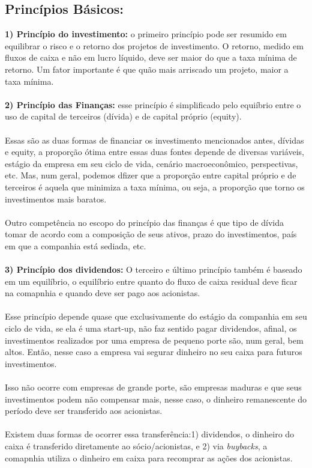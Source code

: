 \subsection*{Princípios Básicos:}
\textbf{1) Princípio do investimento:} o primeiro princípio pode ser resumido em equilibrar o risco e o retorno dos projetos de investimento. O retorno, medido em fluxos de caixa e não em lucro líquido, deve ser maior do que a taxa mínima de retorno. Um fator importante é que quão mais arriscado um projeto, maior a taxa mínima.
\\~\\
\textbf{2) Princípio das Finanças:} esse princípio é simplificado pelo equiíbrio entre o uso de capital de terceiros (dívida) e de capital próprio (equity).
\\~\\
Essas são as duas formas de financiar os investimento mencionados antes, dívidas e equity, a proporção ótima entre essas duas fontes depende de diversas variáveis, estágio da empresa em seu ciclo de vida, cenário macroeconômico, perspectivas, etc. Mas, num geral, podemos dfizer que a proporção entre capital próprio e de terceiros é aquela que minimiza a taxa mínima, ou seja, a proporção que torno os investimentos mais baratos.
\\~\\
Outro competência no escopo do princípio das finanças é que tipo de dívida tomar de acordo com a composição de seus ativos, prazo do investimentos, país em que a companhia está sediada, etc.
\\~\\
\textbf{3) Princípio dos dividendos: } O terceiro e último princípio também é baseado em um equilíbrio, o equilíbrio entre quanto do fluxo de caixa residual deve ficar na comapnhia e quando deve ser pago aos acionistas.
\\~\\
Esse princípio depende quase que exclusivamente do estágio da companhia em seu ciclo de vida, se ela é uma start-up, não faz sentido pagar dividendos, afinal, os investimentos realizados por uma empresa de pequeno porte são, num geral, bem altos. Então, nesse caso a empresa vai segurar dinheiro no seu caixa para futuros investimentos.
\\~\\
Isso não ocorre com empresas de grande porte, são empresas maduras e que seus investimentos podem não compensar mais, nesse caso, o dinheiro remanescente do período deve ser transferido aos acionistas. 
\\~\\
Existem duas formas de ocorrer essa transferência:1) dividendos, o dinheiro do caixa é transferido diretamente ao sócio/acionistas, e 2) via \textit{buybacks}, a comapnhia utiliza o dinheiro em caixa para recomprar as ações dos acionistas.
\\~\\

